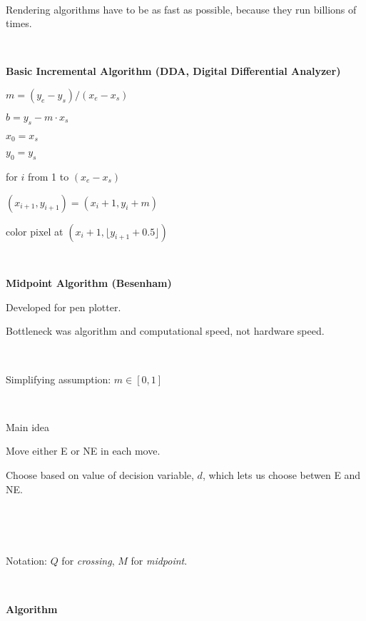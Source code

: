 \

Rendering algorithms have to be as fast as possible, because they run billions of times.  

\

{\bf Basic Incremental Algorithm (DDA, Digital Differential Analyzer)}

$m = (y_e - y_s) / (x_e - x_s)$

$b = y_s - m \cdot x_s$

$x_0 = x_s$

$y_0 = y_s$

for $i$ from 1 to $(x_e - x_s)$

\qquad $(x_{i+1}, y_{i+1}) = (x_i + 1, y_i + m)$

\qquad color pixel at $(x_i+1, \lfloor y_{i+1} + 0.5 \rfloor )$ 

\

{\bf Midpoint Algorithm (Besenham)}

Developed for pen plotter.

Bottleneck was algorithm and computational speed, not hardware speed.

\

Simplifying assumption:  $m \in [0,1]$

\

Main idea

\qquad Move either E or NE in each move.  

\qquad Choose based on value of decision variable, $d$, which lets us choose betwen E and NE.  

\

\

\hfil{}

Notation:   $Q$ for {\it crossing}, $M$ for {\it midpoint}.

\

{\bf Algorithm}

